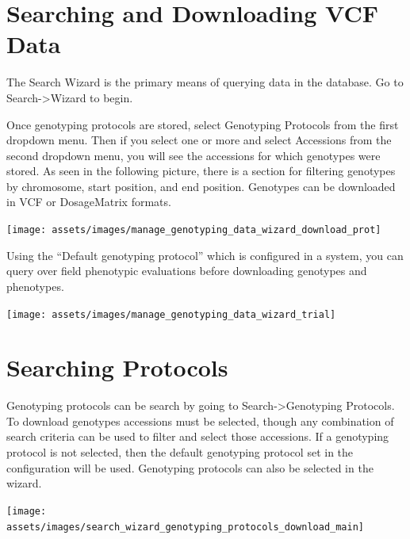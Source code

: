 \documentclass[
  12pt,
]{book}
\begin{document}
\hypertarget{searching-and-downloading-vcf-data}{%
\section{Searching and Downloading VCF Data}\label{searching-and-downloading-vcf-data}}

The Search Wizard is the primary means of querying data in the database. Go to Search-\textgreater Wizard to begin.

Once genotyping protocols are stored, select Genotyping Protocols from the first dropdown menu. Then if you select one or more and select Accessions from the second dropdown menu, you will see the accessions for which genotypes were stored. As seen in the following picture, there is a section for filtering genotypes by chromosome, start position, and end position. Genotypes can be downloaded in VCF or DosageMatrix formats.

\begin{center}\texttt{[image: assets/images/manage\_genotyping\_data\_wizard\_download\_prot]} \end{center}

Using the ``Default genotyping protocol'' which is configured in a system, you can query over field phenotypic evaluations before downloading genotypes and phenotypes.

\begin{center}\texttt{[image: assets/images/manage\_genotyping\_data\_wizard\_trial]} \end{center}

\hypertarget{searching-protocols}{%
\section{Searching Protocols}\label{searching-protocols}}

Genotyping protocols can be search by going to Search-\textgreater Genotyping Protocols. To download genotypes accessions must be selected, though any combination of search criteria can be used to filter and select those accessions. If a genotyping protocol is not selected, then the default genotyping protocol set in the configuration will be used. Genotyping protocols can also be selected in the wizard.

\begin{center}\texttt{[image: assets/images/search\_wizard\_genotyping\_protocols\_download\_main]} \end{center}
\end{document}
